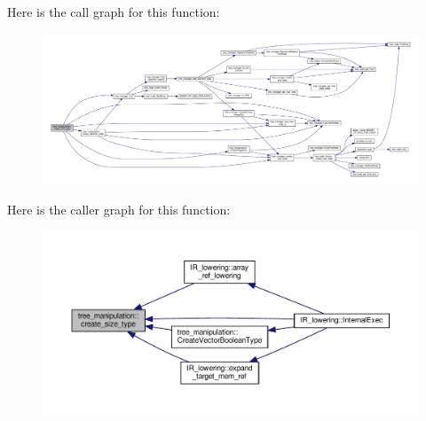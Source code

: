 Here is the call graph for this function\+:
\nopagebreak
\begin{figure}[H]
\begin{center}
\leavevmode
\includegraphics[width=350pt]{d0/d99/classtree__manipulation_a5db8217303c41bbc32245048823ad804_cgraph}
\end{center}
\end{figure}
Here is the caller graph for this function\+:
\nopagebreak
\begin{figure}[H]
\begin{center}
\leavevmode
\includegraphics[width=350pt]{d0/d99/classtree__manipulation_a5db8217303c41bbc32245048823ad804_icgraph}
\end{center}
\end{figure}
\mbox{\label{classtree__manipulation_a690ffa0d5f4e3c3aaaa38742b1ca0912}} 
